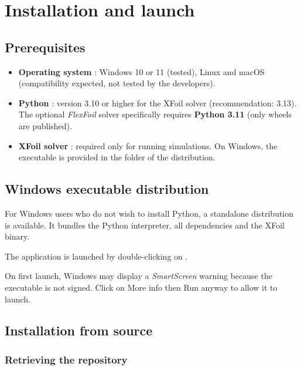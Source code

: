 \chapter{Installation and launch}
\label{chap:installation}

\section{Prerequisites}

\begin{itemize}
    \item \textbf{Operating system} : Windows 10 or 11
        (tested), Linux and macOS (compatibility expected, not
        tested by the developers).
    \item \textbf{Python} : version 3.10 or higher for the XFoil
        solver (recommendation: 3.13). The optional \emph{FlexFoil}
        solver specifically requires \textbf{Python 3.11} (only
         wheels are published).
    \item \textbf{XFoil solver} : required only for
        running simulations. On Windows, the executable
         is provided in the
         folder of the distribution.
\end{itemize}

\section{Windows executable distribution}

For Windows users who do not wish to install Python,
a standalone  distribution is available. It
bundles the Python interpreter, all dependencies and the
XFoil binary.

The application is launched by double-clicking on
.

\begin{noteinfo}
On first launch, Windows may display a
\emph{SmartScreen} warning because the executable is not signed. Click
on \og More info \fg{} then \og Run
anyway \fg{} to allow it to launch.
\end{noteinfo}

\section{Installation from source}

\subsection{Retrieving the repository}

